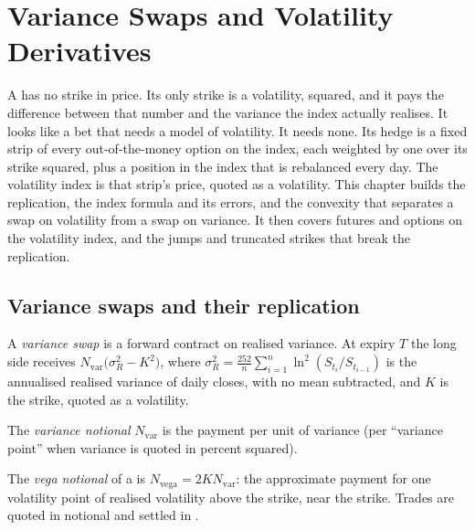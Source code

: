 \chapter{Variance Swaps and Volatility Derivatives}\label{ch:dv:variance-swaps-and-volatility-derivatives}

A  has no strike in price. Its only strike is a volatility, squared, and it pays the difference
between that number and the variance the index actually realises. It looks like a bet that needs a model of
volatility. It needs none. Its hedge is a fixed strip of every out-of-the-money option on the index, each
weighted by one over its strike squared, plus a position in the index that is rebalanced every day. The
volatility index is that strip's price, quoted as a volatility. This chapter builds the replication, the
index formula and its errors, and the convexity that separates a swap on volatility from a swap on variance.
It then covers futures and options on the volatility index, and the jumps and truncated strikes that break
the replication.

\section{Variance swaps and their replication}

\begin{definition}\label{def:dv:variance-swaps-and-volatility-derivatives:vs}
A \emph{variance swap} is a forward contract on realised variance. At expiry $T$ the long
side receives $N_{\mathrm{var}}\bigl(\sigma_R^2-K^2\bigr)$, where
$\sigma_R^2=\frac{252}{n}\sum_{i=1}^n\ln^2(S_{t_i}/S_{t_{i-1}})$ is the annualised realised variance of daily
closes, with no mean subtracted, and $K$ is the strike, quoted as a volatility.
\end{definition}

\begin{definition}\label{def:dv:variance-swaps-and-volatility-derivatives:varnot}
The \emph{variance notional} $N_{\mathrm{var}}$ is the payment per unit of variance
(per ``variance point'' when variance is quoted in percent squared).
\end{definition}

\begin{definition}\label{def:dv:variance-swaps-and-volatility-derivatives:veganot}
The \emph{vega notional} of a  is $N_{\mathrm{vega}}=2KN_{\mathrm{var}}$: the
approximate payment for one volatility point of realised volatility above the strike, near the strike.
Trades are quoted in  notional and settled in .
\end{definition}


